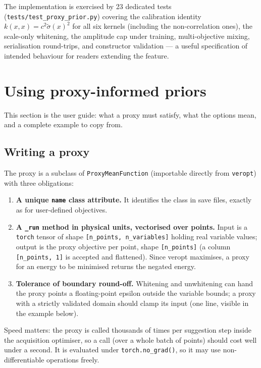\documentclass[11pt,a4paper]{article}
\newcommand{\veropt}{\textsf{veropt}}
\newcommand{\code}[1]{\texttt{#1}}
\begin{document}
The implementation is exercised by 23 dedicated tests
(\code{tests/test\_proxy\_prior.py}) covering the calibration identity
$k(x,x) = c^2\tilde\sigma(x)^2$ for all six kernels (including the
non-correlation ones), the scale-only whitening, the amplitude cap under
training, multi-objective mixing, serialisation round-trips, and constructor
validation --- a useful specification of intended behaviour for readers
extending the feature.

\section{Using proxy-informed priors}
\label{sec:usage}

This section is the user guide: what a proxy must satisfy, what the options
mean, and a complete example to copy from.

\subsection{Writing a proxy}

The proxy is a subclass of \code{ProxyMeanFunction} (importable directly
from \code{veropt}) with three obligations:

\begin{enumerate}
  \item \textbf{A unique \code{name} class attribute.} It identifies the
    class in save files, exactly as for user-defined objectives.
  \item \textbf{A \code{\_run} method in physical units, vectorised over
    points.} Input is a \code{torch} tensor of shape
    \code{[n\_points, n\_variables]} holding real variable values; output is
    the proxy objective per point, shape \code{[n\_points]} (a column
    \code{[n\_points, 1]} is accepted and flattened). Since \veropt{}
    maximises, a proxy for an energy to be minimised returns the negated
    energy.
  \item \textbf{Tolerance of boundary round-off.} Whitening and unwhitening
    can hand the proxy points a floating-point epsilon outside the variable
    bounds; a proxy with a strictly validated domain should clamp its input
    (one line, visible in the example below).
\end{enumerate}

Speed matters: the proxy is called thousands of times per suggestion step
inside the acquisition optimiser, so a call (over a whole batch of points)
should cost well under a second. It is evaluated under \code{torch.no\_grad()},
so it may use non-differentiable operations freely.
\end{document}
